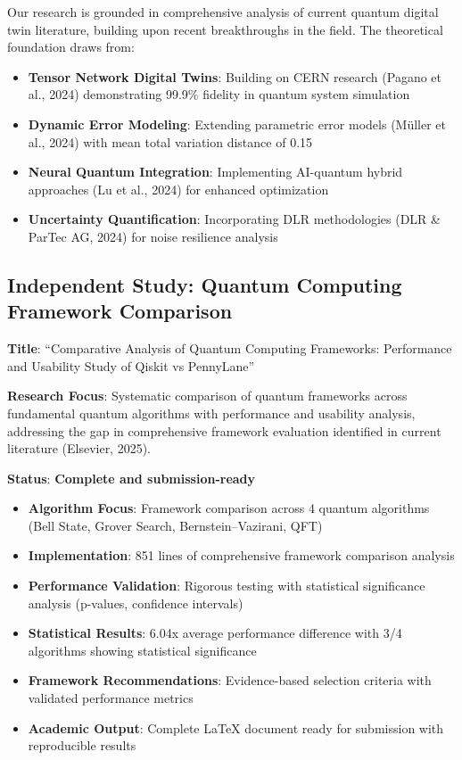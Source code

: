 \documentclass[12pt,a4paper]{article}
\begin{document}
Our research is grounded in comprehensive analysis of current quantum digital twin literature, building upon recent breakthroughs in the field. The theoretical foundation draws from:

\begin{itemize}
    \item \textbf{Tensor Network Digital Twins}: Building on CERN research (Pagano et al., 2024) demonstrating 99.9\% fidelity in quantum system simulation
    \item \textbf{Dynamic Error Modeling}: Extending parametric error models (Müller et al., 2024) with mean total variation distance of 0.15
    \item \textbf{Neural Quantum Integration}: Implementing AI-quantum hybrid approaches (Lu et al., 2024) for enhanced optimization
    \item \textbf{Uncertainty Quantification}: Incorporating DLR methodologies (DLR \& ParTec AG, 2024) for noise resilience analysis
\end{itemize}

\subsection{Independent Study: Quantum Computing Framework Comparison}

\textbf{Title}: ``Comparative Analysis of Quantum Computing Frameworks: Performance and Usability Study of Qiskit vs PennyLane''

\textbf{Research Focus}: Systematic comparison of quantum frameworks across fundamental quantum algorithms with performance and usability analysis, addressing the gap in comprehensive framework evaluation identified in current literature (Elsevier, 2025).

\textbf{Status}: \textcolor{successgreen}{\textbf{Complete and submission-ready}}

\begin{itemize}
    \item \textbf{Algorithm Focus}: Framework comparison across 4 quantum algorithms (Bell State, Grover Search, Bernstein--Vazirani, QFT)
    \item \textbf{Implementation}: 851 lines of comprehensive framework comparison analysis
    \item \textbf{Performance Validation}: Rigorous testing with statistical significance analysis (p-values, confidence intervals)
    \item \textbf{Statistical Results}: 6.04x average performance difference with 3/4 algorithms showing statistical significance  
    \item \textbf{Framework Recommendations}: Evidence-based selection criteria with validated performance metrics
    \item \textbf{Academic Output}: Complete LaTeX document ready for submission with reproducible results
\end{itemize}
\end{document}

